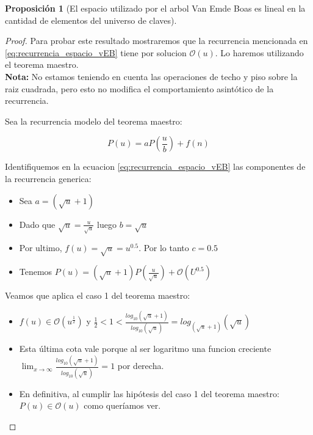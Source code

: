\documentclass[10pt,a4paper]{article}
\newtheorem{proposition}{Proposici\'on}
\begin{document}
\begin{proposition}[El espacio utilizado por el arbol Van Emde Boas es lineal en la cantidad de elementos del universo de claves]
\end{proposition}
\begin{proof}
Para probar este resultado mostraremos que la recurrencia mencionada en \ref{eq:recurrencia_espacio_vEB} tiene por solucion $\mathcal{O}(u)$. Lo haremos utilizando el teorema maestro.\\
 
 \textbf{Nota: } No estamos teniendo en cuenta las operaciones de techo y piso sobre la raiz cuadrada, pero esto no modifica el comportamiento asintótico de la recurrencia.
 
 Sea la recurrencia modelo del teorema maestro:
 
 \begin{equation}
    \label{eq:recurrencia_teorema_maestro}
    P(u) = aP(\frac{u}{b}) + f(n)
\end{equation}
 
 Identifiquemos en la ecuacion \ref{eq:recurrencia_espacio_vEB} las componentes de la recurrencia generica:
 
\begin{itemize}
    \item Sea $a = (\sqrt{u} + 1)$
    \item Dado que $\sqrt{u} = \frac{u}{\sqrt{u}}$ luego $b = \sqrt{u}$
    \item Por ultimo, $f(u) = \sqrt{u} = u^{0.5}$. Por lo tanto $c = 0.5$
    \item Tenemos $P(u) = (\sqrt{u}+1)P(\frac{u}{\sqrt{u}}) + \mathcal{O}(U^{0.5})$
\end{itemize}
Veamos que aplica el caso 1 del teorema maestro:
\begin{itemize}
\item $f(u) \in \mathcal{O}(u^{\frac{1}{2}})$ y $\frac{1}{2} < 1 < \frac{log_{10}(\sqrt{u}+1)}{log_{10}(\sqrt{u})} = log_{(\sqrt{u} + 1)}(\sqrt{u})$
\item Esta última cota vale porque al ser logaritmo una funcion creciente $\lim_{x \to \infty} \frac{log_{10}(\sqrt{u}+1)}{log_{10}(\sqrt{u})} = 1$ por derecha.
\item En definitiva, al cumplir las hipótesis del caso 1 del teorema maestro: $P(u) \in \mathcal{O}(u)$ como queríamos ver.
\end{itemize}
\end{proof}
\end{document}
